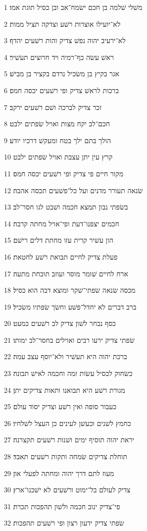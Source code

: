 \par 1 משׁלי שׁלמה בן חכם ישׂמח־אב ובן כסיל תוגת אמו׃
\par 2 לא־יועילו אוצרות רשׁע וצדקה תציל ממות׃
\par 3 לא־ירעיב יהוה נפשׁ צדיק והות רשׁעים יהדף׃
\par 4 ראשׁ עשׂה כף־רמיה ויד חרוצים תעשׁיר׃
\par 5 אגר בקיץ בן משׂכיל נרדם בקציר בן מבישׁ׃
\par 6 ברכות לראשׁ צדיק ופי רשׁעים יכסה חמס׃
\par 7 זכר צדיק לברכה ושׁם רשׁעים ירקב׃
\par 8 חכם־לב יקח מצות ואויל שׂפתים ילבט׃
\par 9 הולך בתם ילך בטח ומעקשׁ דרכיו יודע׃
\par 10 קרץ עין יתן עצבת ואויל שׂפתים ילבט׃
\par 11 מקור חיים פי צדיק ופי רשׁעים יכסה חמס׃
\par 12 שׂנאה תעורר מדנים ועל כל־פשׁעים תכסה אהבה׃
\par 13 בשׂפתי נבון תמצא חכמה ושׁבט לגו חסר־לב׃
\par 14 חכמים יצפנו־דעת ופי־אויל מחתה קרבה׃
\par 15 הון עשׁיר קרית עזו מחתת דלים רישׁם׃
\par 16 פעלת צדיק לחיים תבואת רשׁע לחטאת׃
\par 17 ארח לחיים שׁומר מוסר ועוזב תוכחת מתעה׃
\par 18 מכסה שׂנאה שׂפתי־שׁקר ומוצא דבה הוא כסיל׃
\par 19 ברב דברים לא יחדל־פשׁע וחשׂך שׂפתיו משׂכיל׃
\par 20 כסף נבחר לשׁון צדיק לב רשׁעים כמעט׃
\par 21 שׂפתי צדיק ירעו רבים ואוילים בחסר־לב ימותו׃
\par 22 ברכת יהוה היא תעשׁיר ולא־יוסף עצב עמה׃
\par 23 כשׂחוק לכסיל עשׂות זמה וחכמה לאישׁ תבונה׃
\par 24 מגורת רשׁע היא תבואנו ותאות צדיקים יתן׃
\par 25 כעבור סופה ואין רשׁע וצדיק יסוד עולם׃
\par 26 כחמץ לשׁנים וכעשׁן לעינים כן העצל לשׁלחיו׃
\par 27 יראת יהוה תוסיף ימים ושׁנות רשׁעים תקצרנה׃
\par 28 תוחלת צדיקים שׂמחה ותקות רשׁעים תאבד׃
\par 29 מעוז לתם דרך יהוה ומחתה לפעלי און׃
\par 30 צדיק לעולם בל־ימוט ורשׁעים לא ישׁכנו־ארץ׃
\par 31 פי־צדיק ינוב חכמה ולשׁון תהפכות תכרת׃
\par 32 שׂפתי צדיק ידעון רצון ופי רשׁעים תהפכות׃

